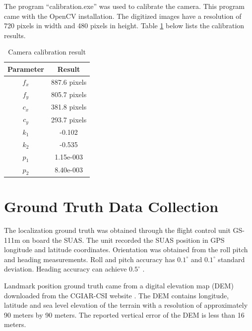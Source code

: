 The program ``calibration.exe'' was used to calibrate the camera. This
program came with the OpenCV installation. The digitized images have a
resolution of 720 pixels in width and 480 pixels in height. Table
\ref{tab:camcalresult} below lists the calibration results.

\begin{table}[h]
\caption{Camera calibration result}
\label{tab:camcalresult}
\centering
\begin{tabular}{|c|c|}
\hline
Parameter & Result\\ \hline
$f_x$ & 887.6 pixels \\ \hline
$f_y$ & 805.7 pixels\\ \hline
$c_x$ & 381.8 pixels\\ \hline
$c_y$ & 293.7 pixels\\ \hline
$k_1$ & -0.102 \\ \hline
$k_2$ & -0.535 \\ \hline
$p_1$ & 1.15e-003 \\ \hline
$p_2$ & 8.40e-003 \\
\hline
\end{tabular}
\end{table}
\FloatBarrier

\section{Ground Truth Data Collection}
The localization ground truth was obtained through the flight
control unit GS-111m on board the SUAS. The unit recorded the SUAS
position in GPS longitude and latitude coordinates. Orientation was
obtained from the roll pitch and heading measurements. Roll and pitch
accuracy has $0.1^\circ$ and $0.1^\circ$ standard deviation.
Heading accuracy can achieve $0.5^\circ$ \cite{_athena_????}.

Landmark position ground truth came from a digital elevation map (DEM)
downloaded from the CGIAR-CSI website \cite{_cgiar-csi_????}. The DEM
contains longitude, latitude and sea level elevation of the terrain
with a resolution of approximately 90 meters by 90 meters. The
reported vertical error of the DEM is less than 16 meters. 



